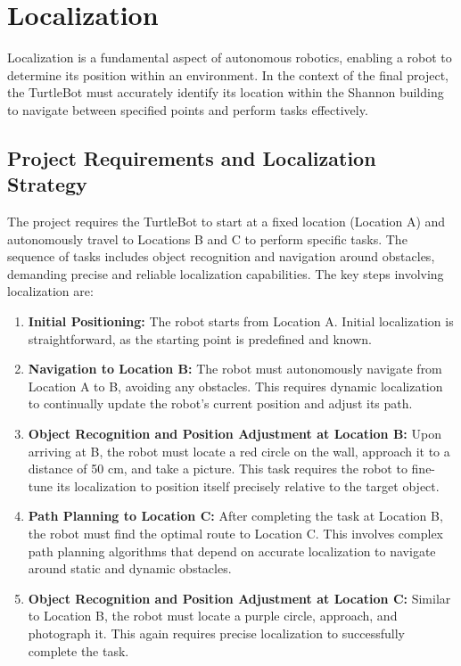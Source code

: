 \documentclass{article}
\begin{document}
	\section{Localization}
	Localization is a fundamental aspect of autonomous robotics, enabling a robot to determine its position within an environment. In the context of the final project, the TurtleBot must accurately identify its location within the Shannon building to navigate between specified points and perform tasks effectively.
	
	\subsection{Project Requirements and Localization Strategy}
	The project requires the TurtleBot to start at a fixed location (Location A) and autonomously travel to Locations B and C to perform specific tasks. The sequence of tasks includes object recognition and navigation around obstacles, demanding precise and reliable localization capabilities. The key steps involving localization are:
	
	\begin{enumerate}
		\item \textbf{Initial Positioning:} The robot starts from Location A. Initial localization is straightforward, as the starting point is predefined and known.
		\item \textbf{Navigation to Location B:} The robot must autonomously navigate from Location A to B, avoiding any obstacles. This requires dynamic localization to continually update the robot's current position and adjust its path.
		\item \textbf{Object Recognition and Position Adjustment at Location B:} Upon arriving at B, the robot must locate a red circle on the wall, approach it to a distance of 50 cm, and take a picture. This task requires the robot to fine-tune its localization to position itself precisely relative to the target object.
		\item \textbf{Path Planning to Location C:} After completing the task at Location B, the robot must find the optimal route to Location C. This involves complex path planning algorithms that depend on accurate localization to navigate around static and dynamic obstacles.
		\item \textbf{Object Recognition and Position Adjustment at Location C:} Similar to Location B, the robot must locate a purple circle, approach, and photograph it. This again requires precise localization to successfully complete the task.
	\end{enumerate}
	
\end{document}
